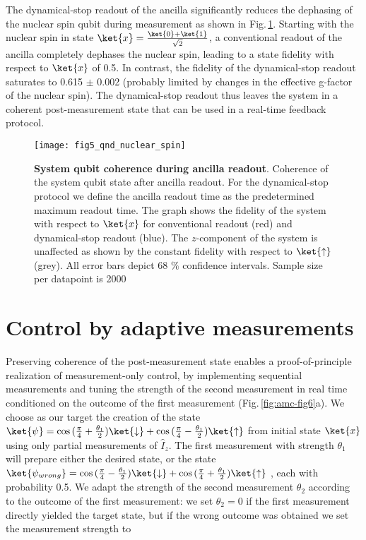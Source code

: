 The dynamical-stop readout of the ancilla significantly reduces the dephasing of the nuclear spin qubit during measurement as shown in Fig.\,\ref{fig:amc-fig5}. Starting with the nuclear spin in state $\ket{x} = \frac{\ket{0} + \ket{1}}{\sqrt{2}}$, a conventional readout of the ancilla completely dephases the nuclear spin, leading to a state fidelity with respect to $\ket{x}$ of 0.5. In contrast, the fidelity of the dynamical-stop readout saturates to 0.615 $\pm$ 0.002 (probably limited by changes in the effective g-factor of the nuclear spin). The dynamical-stop readout thus leaves the system in a coherent post-measurement state that can be used in a real-time feedback protocol. 

\begin{figure*}
	\centering
	\texttt{[image: fig5\_qnd\_nuclear\_spin]}
	\caption{\label{fig:amc-fig5} \textbf{System qubit coherence during ancilla readout}. Coherence of the system qubit state after ancilla readout. For the dynamical-stop protocol we define the ancilla readout time as the predetermined maximum readout time. The graph shows the fidelity of the system with respect to $\ket{x}$ for conventional readout (red) and dynamical-stop readout (blue). The $z$-component of the system is unaffected as shown by the constant fidelity with respect to $\ket{\uparrow}$ (grey). All error bars depict 68 $\%$ confidence intervals. Sample size per datapoint is 2000 }
\end{figure*}

\section{Control by adaptive measurements}
Preserving coherence of the post-measurement state enables a proof-of-principle realization of measurement-only control, by implementing sequential measurements and tuning the strength of the second measurement in real time conditioned on the outcome of the first measurement (Fig.\,\ref{fig:amc-fig6}a). We choose as our target the creation of the state $\ket{\psi} = \cos{(\frac{\pi}{4}+\frac{\theta_1}{2})}\ket{\downarrow}+\cos{(\frac{\pi}{4}-\frac{\theta_1}{2})}\ket{\uparrow}$ from initial state $\ket{x}$ using only partial measurements of $\hat{I}_z$. The first measurement with strength $\theta_1$ will prepare either the desired state, or the state $\ket{\psi_{wrong}} =  \cos{(\frac{\pi}{4}-\frac{\theta_1}{2})}\ket{\downarrow}+\cos{(\frac{\pi}{4}+\frac{\theta_1}{2})}\ket{\uparrow}$ , each with probability 0.5. We adapt the strength of the second measurement $\theta_2$ according to the outcome of the first measurement: we set $\theta_2 = 0$ if the first measurement directly yielded the target state, but if the wrong outcome was obtained we set the measurement strength to

